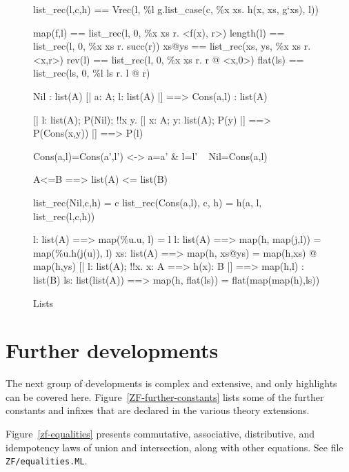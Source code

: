 \begin{figure}\underscoreon %
\begin{ttbox}
    list_rec(l,c,h) == 
                Vrec(l, \%l g.list_case(c, \%x xs. h(x, xs, g`xs), l))

         map(f,l)  == list_rec(l,  0,  \%x xs r. <f(x), r>)
      length(l) == list_rec(l,  0,  \%x xs r. succ(r))
         xs@ys     == list_rec(xs, ys, \%x xs r. <x,r>)
         rev(l)    == list_rec(l,  0,  \%x xs r. r @ <x,0>)
        flat(ls)  == list_rec(ls, 0,  \%l ls r. l @ r)

            Nil : list(A)
           [| a: A;  l: list(A) |] ==> Cons(a,l) : list(A)

    [| l: list(A);
       P(Nil);
       !!x y. [| x: A;  y: list(A);  P(y) |] ==> P(Cons(x,y))
    |] ==> P(l)

        Cons(a,l)=Cons(a',l') <-> a=a' & l=l'
    ~ Nil=Cons(a,l)

       A<=B ==> list(A) <= list(B)

    list_rec(Nil,c,h) = c
   list_rec(Cons(a,l), c, h) = h(a, l, list_rec(l,c,h))

       l: list(A) ==> map(\%u.u, l) = l
     l: list(A) ==> map(h, map(j,l)) = map(\%u.h(j(u)), l)
 xs: list(A) ==> map(h, xs@ys) = map(h,xs) @ map(h,ys)
    [| l: list(A);  !!x. x: A ==> h(x): B |] ==> map(h,l) : list(B)
    ls: list(list(A)) ==> map(h, flat(ls)) = flat(map(map(h),ls))
\end{ttbox}
\caption{Lists} \label{zf-list}
\end{figure}

\section{Further developments}
The next group of developments is complex and extensive, and only
highlights can be covered here.  Figure~\ref{ZF-further-constants} lists
some of the further constants and infixes that are declared in the various
theory extensions.

Figure~\ref{zf-equalities} presents commutative, associative, distributive,
and idempotency laws of union and intersection, along with other equations.
See file {\tt ZF/equalities.ML}.

